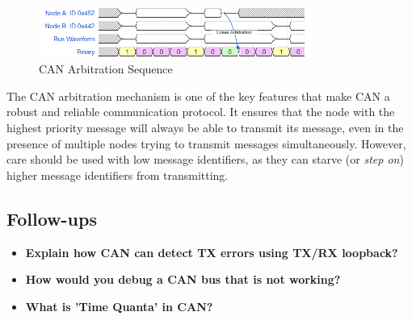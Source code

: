 \documentclass[main.tex]{subfiles}
\begin{document}
\begin{figure}[H]
    \centering
    \includegraphics[width=0.8\textwidth]{images/can_bus_arbitration.png}
    \caption{CAN Arbitration Sequence}
    \label{fig:can-arbitration}
\end{figure}

\noindent The CAN arbitration mechanism is one of the key features that make CAN a robust and reliable communication protocol. It ensures that the node with the highest priority message will always be able to transmit its message, even in the presence of multiple nodes trying to transmit messages simultaneously. However, care should be used with low message identifiers, as they can starve (or \textit{step on}) higher message identifiers from transmitting.

\subsection{Follow-ups}
\begin{itemize}
    \item \textbf{Explain how CAN can detect TX errors using TX/RX loopback?}
    \item \textbf{How would you debug a CAN bus that is not working?}
    \item \textbf{What is 'Time Quanta' in CAN?}
\end{itemize}
\end{document}
